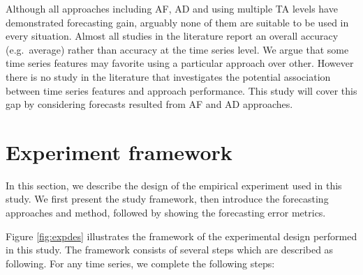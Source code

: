 \documentclass[]{elsarticle} %
\begin{document}
Although all approaches including AF, AD and using multiple TA levels
have demonstrated forecasting gain, arguably none of them are suitable
to be used in every situation. Almost all studies in the literature
report an overall accuracy (e.g.~average) rather than accuracy at the
time series level. We argue that some time series features may favorite
using a particular approach over other. However there is no study in the
literature that investigates the potential association between time
series features and approach performance. This study will cover this gap
by considering forecasts resulted from AF and AD approaches.

\hypertarget{framework}{%
\section{Experiment framework}\label{framework}}

In this section, we describe the design of the empirical experiment used
in this study. We first present the study framework, then introduce the
forecasting approaches and method, followed by showing the forecasting
error metrics.

Figure \ref{fig:expdes} illustrates the framework of the experimental
design performed in this study. The framework consists of several steps
which are described as following. For any time series, we complete the
following steps:
\end{document}
